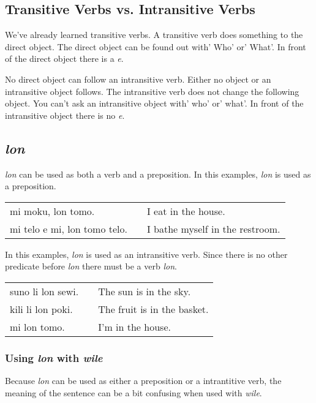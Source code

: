 \subsection*{Transitive Verbs vs. Intransitive Verbs}
%
We've already learned transitive verbs. 
A transitive verb does something to the direct object. 
The direct object can be found out with' Who' or' What'. 
In front of the direct object there is a \textit{e}.

No direct object can follow an intransitive verb. 
Either no object or an intransitive object follows. 
The intransitive verb does not change the following object. 
You can't ask an intransitive object with' who' or' what'.
In front of the intransitive object there is no \textit{e}.
%
\subsection*{\textit{lon}}
%
\textit{lon} can be used as both a verb and a preposition. 
In this examples, \textit{lon} is used as a preposition.

\begin{supertabular}{p{5,5cm}|ll}
mi moku, lon tomo. && I eat in the house. \\
mi telo e mi, lon tomo telo. && I bathe myself in the restroom. \\
\end{supertabular} 

In this examples, \textit{lon} is used as an intransitive verb. 
Since there is no other predicate before \textit{lon} there must be a verb \textit{lon}.

\begin{supertabular}{p{5,5cm}|ll}
suno li lon sewi. && The sun is in the sky. \\
kili li lon poki. && The fruit is in the basket. \\
mi lon tomo. && I'm in the house. \\
\end{supertabular} 
%
\subsubsection*{Using \textit{lon} with \textit{wile}}
%
Because \textit{lon} can be used as either a preposition or a intrantitive verb, the meaning of the sentence can be a bit confusing when used with \textit{wile}. 

